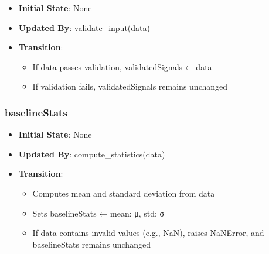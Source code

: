 \documentclass[12pt, titlepage]{article}
\begin{document}
\begin{itemize}
\item
\textbf{Initial State}: None



\item
\textbf{Updated By}: validate\_input(data)



\item
\textbf{Transition}:




\begin{itemize}
\item
If data passes validation, validatedSignals ← data



\item
If validation fails, validatedSignals remains unchanged



\end{itemize}




\end{itemize}








\subsubsection*{\textbf{baselineStats}}





\begin{itemize}
\item
\textbf{Initial State}: None



\item
\textbf{Updated By}: compute\_statistics(data)



\item
\textbf{Transition}:




\begin{itemize}
\item
Computes mean and standard deviation from data



\item
Sets baselineStats ← {mean: μ, std: σ}



\item
If data contains invalid values (e.g., NaN), raises NaNError, and baselineStats remains unchanged



\end{itemize}




\end{itemize}
\end{document}
